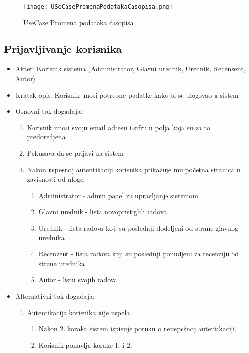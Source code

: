 \documentclass[a4paper]{article}
\begin{document}
\begin{figure}[hbt!]
    \centering
    \texttt{[image: USeCasePromenaPodatakaCasopisa.png]}
    \caption{UseCase Promena podataka časopisa}
    \label{fig:my_label}
\end{figure}

\subsection{Prijavljivanje korisnika}
\begin{itemize}
    \item Akter: Korisnik sistema (Administrator, Glavni urednik, Urednik, Recenzent, Autor)
    \item Kratak opis: Korisnik unosi potrebne podatke kako bi se ulogovao u sistem
    \item Osnovni tok događaja:
        \begin{enumerate}
            \item Korisnik unosi svoju email adresu i sifru u polja koja su za to predoredjena
            \item Pokusava da se prijavi na sistem
            \item Nakon uspesnoj autentikaciji korisnika prikazuje mu početna stranica u zavisnosti od uloge:
            \begin{enumerate}
                \item Administrator - admin panel za upravljanje sistemom
                \item Glavni urednik - lista novopristiglih radova
                \item Urednik - lista radova koji su poslednji dodeljeni od strane glavnog urednika
                \item Recenzent - lista radova koji su poslednji ponudjeni za recenziju od strane urednika
                \item Autor - listu svojih radova
            \end{enumerate}
        \end{enumerate}
    \item Alternativni tok događaja:
        \begin{enumerate}
            \item Autentikacija korisnika nije uspela
                \begin{enumerate}
                    \item Nakon 2. koraka sistem ispisuje poruku o neuspešnoj autentikaciji.
                    \item Korisnik ponavlja korake 1. i 2.
                \end{enumerate}
        \end{enumerate}
\end{itemize}
\end{document}
